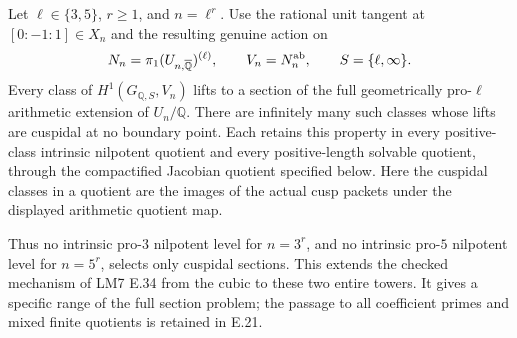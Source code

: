 \begin{theorem}
\label{E-regular-prime-family}
Let $\ell\in\{3,5\}$, $r\ge1$, and $n=\ell^r$.
Use the rational unit tangent at
$[0:-1:1]\in X_n$ and the resulting genuine action
on
\[
 N_n=\pi_1(U_{n,\overline{\mathbb Q}})^{(\ell)},\qquad
 V_n=N_n^{\rm ab},\qquad S=\{\ell,\infty\}.
\]
Every class of $H^1(G_{\mathbb Q,S},V_n)$ lifts to a
section of the full geometrically pro-$\ell$
arithmetic extension of $U_n/\mathbb Q$.
There are infinitely many such classes whose lifts
are cuspidal at no boundary point. Each retains
this property in every positive-class intrinsic
nilpotent quotient and every positive-length
solvable quotient, through the compactified
Jacobian quotient specified below.
Here the cuspidal classes in a quotient are the
images of the actual cusp packets under the
displayed arithmetic quotient map.

Thus no intrinsic pro-$3$ nilpotent level for
$n=3^r$, and no intrinsic pro-$5$ nilpotent level
for $n=5^r$, selects only cuspidal sections. This
extends the checked mechanism of LM7 E.34 from
the cubic to these two entire towers. It gives
a specific range of the full section problem;
the passage to all coefficient primes and
mixed finite quotients is retained in E.21.
\end{theorem}
